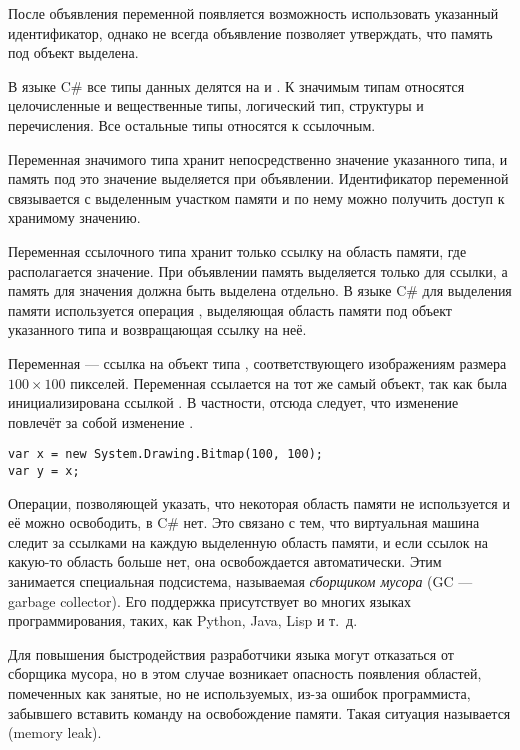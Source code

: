 После объявления переменной появляется возможность использовать
указанный идентификатор, однако не всегда объявление позволяет
утверждать, что память под объект выделена.


В языке C\# все типы данных делятся на  и .
К значимым типам относятся целочисленные и вещественные типы,
логический тип, структуры и перечисления. Все остальные типы относятся
к ссылочным.

Переменная значимого типа хранит непосредственно значение указанного
типа, и память под это значение выделяется при
объявлении. Идентификатор переменной связывается с выделенным участком
памяти и по нему можно получить доступ к хранимому значению.

Переменная ссылочного типа хранит только ссылку на область памяти, где
располагается значение. При объявлении память выделяется только для
ссылки, а память для значения должна быть выделена отдельно. В языке
C\# для выделения памяти используется операция ,
выделяющая область памяти под объект указанного типа и возвращающая
ссылку на неё.

\begin{example}
Переменная  — ссылка на объект типа
, соответствующего
изображениям размера $100\times100$ пикселей.  Переменная 
ссылается на тот же самый объект, так как была инициализирована
ссылкой . В частности, отсюда следует, что изменение
 повлечёт за собой изменение .

\begin{lstlisting}
var x = new System.Drawing.Bitmap(100, 100);
var y = x;
\end{lstlisting}
\end{example}


Операции, позволяющей указать, что некоторая область памяти не
используется и её можно освободить, в C\# нет. Это связано с тем, что
виртуальная машина следит за ссылками на каждую выделенную область
памяти, и если ссылок на какую-то область больше нет, она
освобождается автоматически.  Этим занимается специальная подсистема,
называемая \emph{сборщиком мусора} (GC — garbage collector). Его
поддержка присутствует во многих языках программирования, таких, как
Python, Java, Lisp и т.~д.

Для повышения быстродействия разработчики языка могут отказаться от
сборщика мусора, но в этом случае возникает опасность появления
областей, помеченных как занятые, но не используемых, из-за ошибок
программиста, забывшего вставить команду на освобождение памяти. Такая
ситуация называется  (memory
leak).

